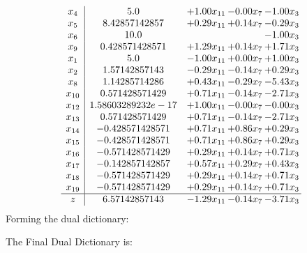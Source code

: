 \documentclass[8pt]{article}
\begin{document}
\[\begin{array}{c| c c@{\hskip 2pt} c@{\hskip 2pt} c@{\hskip 2pt} }
 x_{4}   &  5.0 & +  1.00 x_{11} & -0.00 x_{7} & -1.00 x_{3}\\
 x_{5}   &  8.42857142857 & +  0.29 x_{11} & +  0.14 x_{7} & -0.29 x_{3}\\
 x_{6}   &  10.0  &    &   & -1.00 x_{3}\\
 x_{9}   &  0.428571428571 & +  1.29 x_{11} & +  0.14 x_{7} & +  1.71 x_{3}\\
 x_{1}   &  5.0 & -1.00 x_{11} & +  0.00 x_{7} & +  1.00 x_{3}\\
 x_{2}   &  1.57142857143 & -0.29 x_{11} & -0.14 x_{7} & +  0.29 x_{3}\\
 x_{8}   &  1.14285714286 & +  0.43 x_{11} & -0.29 x_{7} & -5.43 x_{3}\\
 x_{10}   &  0.571428571429 & +  0.71 x_{11} & -0.14 x_{7} & -2.71 x_{3}\\
 x_{12}   &  1.58603289232e-17 & +  1.00 x_{11} & -0.00 x_{7} & -0.00 x_{3}\\
 x_{13}   &  0.571428571429 & +  0.71 x_{11} & -0.14 x_{7} & -2.71 x_{3}\\
 x_{14}   &  -0.428571428571 & +  0.71 x_{11} & +  0.86 x_{7} & +  0.29 x_{3}\\
 x_{15}   &  -0.428571428571 & +  0.71 x_{11} & +  0.86 x_{7} & +  0.29 x_{3}\\
 x_{16}   &  -0.571428571429 & +  0.29 x_{11} & +  0.14 x_{7} & +  0.71 x_{3}\\
 x_{17}   &  -0.142857142857 & +  0.57 x_{11} & +  0.29 x_{7} & +  0.43 x_{3}\\
 x_{18}   &  -0.571428571429 & +  0.29 x_{11} & +  0.14 x_{7} & +  0.71 x_{3}\\
 x_{19}   &  -0.571428571429 & +  0.29 x_{11} & +  0.14 x_{7} & +  0.71 x_{3}\\
\hline
z    &  6.57142857143 & -1.29 x_{11} & -0.14 x_{7} & -3.71 x_{3}\\
\end{array}\]
Forming the dual dictionary:

The Final Dual Dictionary is: 
\end{document}

